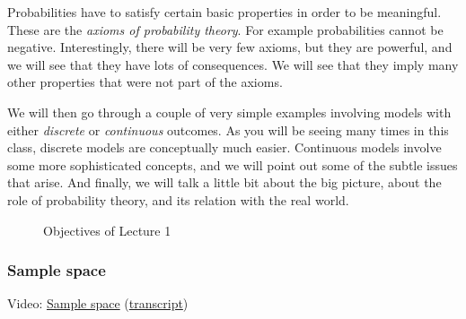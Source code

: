 \documentclass[pdftex, brazil, 12pt, twoside]{article}
\begin{document}
Probabilities have to satisfy certain basic properties in
order to be meaningful.
These are the \emph{axioms of probability theory}.
For example probabilities cannot be negative.
Interestingly, there will be very few axioms, but they are
powerful, and we will see that they have lots of
consequences.
We will see that they imply many other properties that
were not part of the axioms.

We will then go through a couple of very simple examples
involving models with either \emph{discrete}
or \emph{continuous} outcomes.
As you will be seeing many times in this class, discrete
models are conceptually much easier.
Continuous models involve some more sophisticated concepts,
and we will point out some of the subtle issues that arise.
And finally, we will talk a little bit about the big
picture, about the role of probability theory, and its
relation with the real world.

\begin{figure}[H]
  \begin{center}
    \caption{Objectives of Lecture 1}
    \label{fig:obj-lec-1}
  \end{center}
\end{figure}

\subsubsection{Sample space}
\label{un1-lec1-sample-space}

Video: \href{https://www.youtube.com/watch?v=qFBSUg59bWg}{Sample space}
(\href{Unit-1/01\_lecture\_1\_probability\_models\_and\_axioms/l01\_1\_transcripts.pdf}{transcript})
\end{document}
